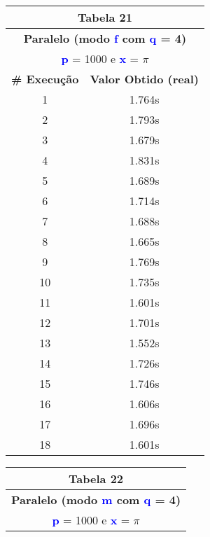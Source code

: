 \documentclass[11pt]{article}
\begin{document}
\begin{table}[!h]
	\begin{center}
		\begin{minipage}{0.48\textwidth}
			\begin{tabular}{| c | c |}
			\hline
			\multicolumn{2}{|c|}{\textbf{Tabela 21}} \\ \hline
			\multicolumn{2}{|c|}{\textbf{Paralelo (modo \textbf{\textcolor{blue}{f}} com \textbf{\textcolor{blue}{q}} = 4)}} \\
			\multicolumn{2}{|c|}{\textbf{\textcolor{blue}{p}} = 1000 e \textbf{\textcolor{blue}{x}} = $\pi$} \\ [0.2ex]
			\hline
				\textbf{\# Execução} &  \textbf{Valor Obtido (real)} \\ \hline
				1 & 1.764s \\ \hline
				2 & 1.793s \\ \hline
				3 & 1.679s \\ \hline
				4 & 1.831s \\ \hline
				5 & 1.689s \\ \hline
				6 & 1.714s \\ \hline
				7 & 1.688s \\ \hline
				8 & 1.665s \\ \hline
				9 & 1.769s \\ \hline
				10 & 1.735s \\ \hline
				11 & 1.601s \\ \hline
				12 & 1.701s \\ \hline
				13 & 1.552s \\ \hline
				14 & 1.726s \\ \hline
				15 & 1.746s \\ \hline
				16 & 1.606s \\ \hline
				17 & 1.696s \\ \hline
				18 & 1.601s \\ \hline
			\end{tabular}
		\end{minipage}
		\begin{minipage}{0.48\textwidth}
			\begin{tabular}{| c | c |}
			\hline
			\multicolumn{2}{|c|}{\textbf{Tabela 22}} \\ \hline
			\multicolumn{2}{|c|}{\textbf{Paralelo (modo \textbf{\textcolor{blue}{m}} com \textbf{\textcolor{blue}{q}} = 4)}} \\
			\multicolumn{2}{|c|}{\textbf{\textcolor{blue}{p}} = 1000 e \textbf{\textcolor{blue}{x}} = $\pi$} \\ [0.2ex]

\end{tabular}
\end{minipage}
\end{center}
\end{table}
\end{document}
